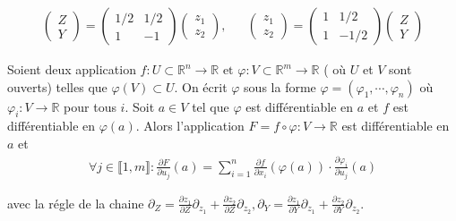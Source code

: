 {\color{gray}  
\begin{eqnarray*}
	\left ( \begin{array}{c} Z \\ Y \end{array} \right ) = \left ( \begin{array}{cc} 1/2 &  1/2  \\ 1 & - 1  \end{array} \right ) \left ( \begin{array}{c} z_1 \\ z_2 \end{array} \right ), & & \left ( \begin{array}{c} z_1 \\ z_2 \end{array} \right ) = \left ( \begin{array}{cc} 1 &  1/2  \\ 1 & - 1/2  \end{array} \right ) \left ( \begin{array}{c} Z \\ Y \end{array} \right )
\end{eqnarray*}


\begin{Propr}
	Soient deux application $f \colon U \subset	 \mathbb{R}^n \rightarrow \mathbb{R} \mbox{ et } \varphi \colon V \subset \mathbb{R}^m \rightarrow \mathbb{R}$ ( où $U$ et $V$ sont ouverts) telles que $\varphi(V) \subset U$. On écrit $\varphi$ sous la forme $\varphi = ( \varphi_1 , \cdots , \varphi_n )$ où $\varphi_i \colon V \rightarrow \mathbb{R} $ pour tous $i$. Soit $a \in V $ tel que $\varphi$ est différentiable en $a$ et $f$ est différentiable en $\varphi(a)$. Alors l'application $F = f \circ \varphi \colon V \rightarrow \mathbb{R}$ est différentiable en $a$ et 
	\begin{eqnarray*}
		\forall j \in \llbracket 1 , m \rrbracket \colon \frac{\partial F}{\partial u_j} ( a ) = \sum_{i=1}^n \frac{\partial f}{ \partial x_i} (\varphi (a) ) \cdot \frac{\partial \varphi_i}{ \partial u_j} (a) 
	\end{eqnarray*} 
\end{Propr}

avec la régle de la chaine  $\partial_Z = \frac{\partial z_1}{\partial Z}\partial_{z_1} + \frac{\partial z_2}{\partial Z}\partial_{z_2}, \partial_Y = \frac{\partial z_1}{\partial Y}\partial_{z_1} + \frac{\partial z_2}{\partial Y}\partial_{z_2}$.

}
